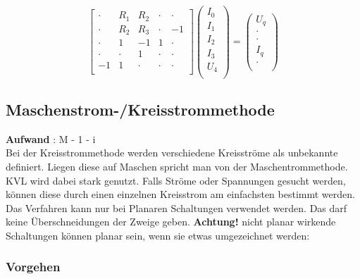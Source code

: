 \[
\begin{bmatrix}
    \cdot & R_1 & R_2 & \cdot  & \cdot\\
    \cdot & R_2 & R_3 & \cdot  & -1\\
    \cdot & 1 & -1 & 1 & \cdot \\
    \cdot & \cdot & 1 & \cdot  & \cdot\\
    -1 & 1 & \cdot & \cdot  & \cdot\\
\end{bmatrix}
\begin{pmatrix}
    I_0\\
    I_1\\
    I_2\\
    I_3\\
    U_4\\
\end{pmatrix}
=
\begin{pmatrix}
    U_q\\
    \cdot\\
    \cdot\\
    I_q\\
    \cdot\\
\end{pmatrix}
\]    

\subsection{Maschenstrom-/Kreisstrommethode}

\textbf{Aufwand} : M - 1 - i\\

Bei der Kreisstrommethode werden verschiedene Kreisströme als unbekannte definiert. 
Liegen diese auf Maschen spricht man von der Maschentrommethode. 
KVL wird dabei stark genutzt. 
Falls Ströme oder Spannungen gesucht werden, können diese durch einen einzelnen Kreisstrom am einfachsten bestimmt werden. \\
Das Verfahren kann nur bei Planaren Schaltungen verwendet werden. 
Das darf keine Überschneidungen der Zweige geben.    
\textbf{Achtung!} nicht planar wirkende Schaltungen können planar sein, wenn sie etwas umgezeichnet werden:

\begin{center}
    
\end{center}

\subsubsection{Vorgehen}

